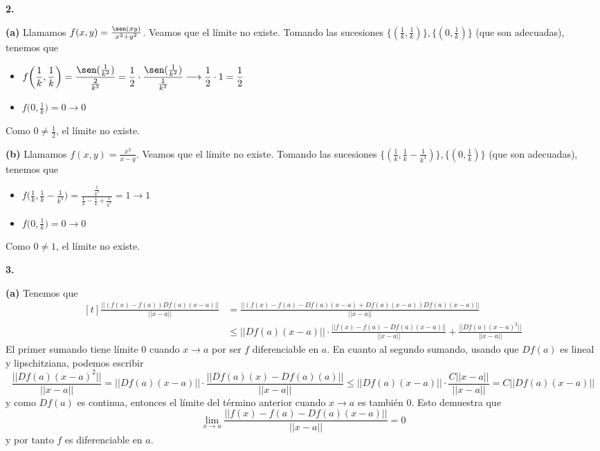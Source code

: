 \documentclass[12pt]{report}
\begin{document}
\vspace{2mm}
\textbf{2. }

\vspace{2mm}
\textbf{(a) } Llamamos $f(x,y) = \frac{\sen(xy)}{x^2+y^2}$. Veamos que el límite no existe. Tomando las sucesiones $\{(\frac{1}{k},\frac{1}{k})\}, \{(0,\frac{1}{k})\}$ (que son adecuadas), tenemos que
\begin{itemize}
    \item $\displaystyle f\biggl(\frac{1}{k},\frac{1}{k} \biggr) = \frac{\sen(\frac{1}{k^2})}{\frac{2}{k^2}} = \frac{1}{2} \cdot \frac{\sen(\frac{1}{k^2})}{\frac{1}{k^2}} \longrightarrow \frac{1}{2} \cdot 1 = \frac{1}{2}$
    \item $\displaystyle f\biggl(0,\frac{1}{k}\biggr) = 0 \longrightarrow 0$
\end{itemize}
Como $0 \neq \frac{1}{2}$, el límite no existe.

\vspace{2mm}
\textbf{(b) } Llamamos $f(x,y) = \frac{x^3}{x-y}$. Veamos que el límite no existe. Tomando las sucesiones $\{(\frac{1}{k},\frac{1}{k}-\frac{1}{k^3})\}, \{(0,\frac{1}{k})\}$ (que son adecuadas), tenemos que
\begin{itemize}
    \item $\displaystyle f\biggl(\frac{1}{k},\frac{1}{k}-\frac{1}{k^3} \biggr) = \frac{\frac{1}{k^3}}{\frac{1}{k} - \frac{1}{k} + \frac{1}{k^3}} = 1 \longrightarrow 1$
    \item $\displaystyle f\biggl(0,\frac{1}{k} \biggr) = 0 \longrightarrow 0$
\end{itemize}
Como $0 \neq 1$, el límite no existe.

\vspace{2mm}
\textbf{3. } 

\vspace{2mm}
\textbf{(a) } Tenemos que
\footnotesize
\[
\begin{aligned}[t]
\frac{||(f(x) - f(a))Df(a)(x-a)||}{||x-a||} &= \frac{||(f(x) - f(a) - Df(a)(x-a) + Df(a)(x-a))Df(a)(x-a)||}{||x-a||} \\
& \leq ||Df(a)(x-a)|| \cdot \frac{||f(x)-f(a)-Df(a)(x-a)||}{||x-a||} + \frac{||Df(a)(x-a)^2||}{||x-a||}
\end{aligned}
\]
\normalsize
El primer sumando tiene límite $0$ cuando $x \to a$ por ser $f$ diferenciable en $a$. En cuanto al segundo sumando, usando que $Df(a)$ es lineal y lipschitziana, podemos escribir
\footnotesize
\[\frac{||Df(a)(x-a)^2||}{||x-a||} = ||Df(a)(x-a)|| \cdot \frac{||Df(a)(x) - Df(a)(a)||}{||x-a||} \leq ||Df(a)(x-a)|| \cdot \frac{C||x-a||}{||x-a||} = C ||Df(a)(x-a)||\]
\normalsize
y como $Df(a)$ es continua, entonces el límite del término anterior cuando $x \to a$ es también $0$. Esto demuestra que
\[\lim_{x \to a}\frac{||f(x)-f(a)-Df(a)(x-a)||}{||x-a||} = 0\]
y por tanto $f$ es diferenciable en $a$.
\end{document}
